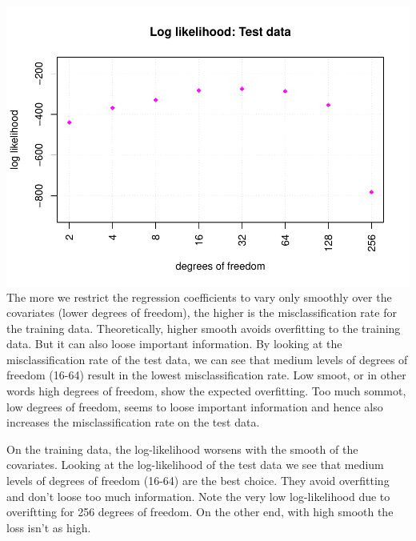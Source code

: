 \documentclass[
]{article}
\begin{document}
\includegraphics{A2_files/figure-latex/unnamed-chunk-25-4.pdf} The more
we restrict the regression coefficients to vary only smoothly over the
covariates (lower degrees of freedom), the higher is the
misclassification rate for the training data. Theoretically, higher
smooth avoids overfitting to the training data. But it can also loose
important information. By looking at the misclassification rate of the
test data, we can see that medium levels of degrees of freedom (16-64)
result in the lowest misclassification rate. Low smoot, or in other
words high degrees of freedom, show the expected overfitting. Too much
sommot, low degrees of freedom, seems to loose important information and
hence also increases the misclassification rate on the test data.

On the training data, the log-likelihood worsens with the smooth of the
covariates. Looking at the log-likelihood of the test data we see that
medium levels of degrees of freedom (16-64) are the best choice. They
avoid overfitting and don't loose too much information. Note the very
low log-likelihood due to overiftting for 256 degrees of freedom. On the
other end, with high smooth the loss isn't as high.
\end{document}
